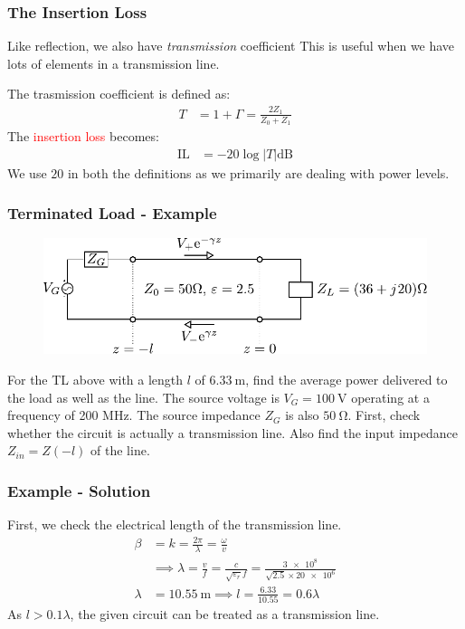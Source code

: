 \documentclass[10pt, compress]{beamer}
\renewcommand{\O}{\omega}  %
\newcommand{\E}{\varepsilon}  %
\begin{document}
\begin{frame}
  \frametitle{The Insertion Loss}
  \begin{outline}
    \1 Like reflection, we also have \textit{transmission} coefficient
    \1 This is useful when we have lots of elements in a transmission line.
  \end{outline}
The trasmission coefficient is defined as:
\begin{align*}
  T &= 1 + \Gamma = \frac{2 Z_{1}}{{Z_{0}} + {Z_{1}}}
\end{align*}
The \textcolor{red}{insertion loss} becomes:
\begin{align*}
  \mathrm{IL} &= -20 \log |T| \mathrm{dB}
\end{align*}
We use $20$ in both the definitions as we primarily are dealing with power levels.

\end{frame}

\begin{frame}
  \frametitle{Terminated Load - Example}
\begin{figure}[t!]
  \centering
  \includegraphics[width=.9\textwidth]{tline_terminated_example.pdf}
\end{figure}
  For the TL above with a length $l$ of $\SI{6.33}{\m}$, find the average power delivered to the load as well as the line. The source voltage is $V_G = \SI{100}{\volt}$ operating at a frequency of 200 MHz. The source impedance $Z_G$ is also $\SI{50}{\ohm}$. First, check whether the circuit is actually a transmission line. Also find the input impedance $Z_{in} = Z(-l)$ of the line.
\end{frame}

\begin{frame}
  \frametitle{Example - Solution}
First, we check the electrical length of the transmission line.
  \begin{align*}
    \beta &= k = \frac{2 \pi}{\lambda} = \frac{\O}{v} \\
    & \implies \lambda = \frac{v}{f} = \frac{c}{\sqrt{\E_r} f} = \frac{\num{3e8}}{\sqrt{2.5} \times \num{20e6}} \\
    \lambda &= \SI{10.55}{\m} \implies l = \frac{6.33}{10.55} = 0.6 \lambda
  \end{align*}
As $l > 0.1 \lambda$, the given circuit can be treated as a transmission line.
\end{frame}
\end{document}
